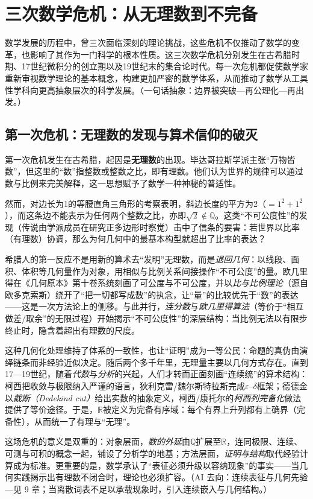 \section{ 三次数学危机：从无理数到不完备}

数学发展的历程中，曾三次面临深刻的理论挑战，这些危机不仅推动了数学的变革，也影响了其作为一门科学的根本性质。这三次数学危机分别发生在古希腊时期、17世纪微积分的创立期以及19世纪末的集合论时代。每一次危机都促使数学家重新审视数学理论的基本概念，构建更加严密的数学体系，从而推动了数学从工具性学科向更高抽象层次的科学发展。{（一句话抽象：边界被突破—再公理化—再出发。）}

\subsection{第一次危机：无理数的发现与算术信仰的破灭}
第一次危机发生在古希腊，起因是{\bf 无理数}的出现。毕达哥拉斯学派主张“万物皆数”，但这里的“数”指整数或整数之比，即有理数。他们认为世界的规律可以通过数与比例来完美解释，这一思想赋予了数学一种神秘的普适性。

然而，对边长为1的等腰直角三角形的考察表明，斜边长度的平方为2（$=1^2+1^2$），而这条边不能表示为任何两个整数之比，亦即$\sqrt{2}\notin \mathbb{Q}$。这类“不可公度性”的发现（传说由学派成员在研究正多边形时察觉）击中了信条的要害：若世界以比率（有理数）协调，那么为何几何中的最基本构型就超出了比率的表达？

希腊人的第一反应不是用新的算术去“发明”无理数，而是{\itshape 退回几何}：以线段、面积、体积等几何量作为对象，用相似与比例关系间接操作“不可公度”的量。欧几里得在《几何原本》第十卷系统刻画了可公度与不可公度，并以{\itshape 比与比例理论}（源自欧多克索斯）绕开了“把一切都写成数”的执念，让“量”的比较优先于“数”的表达——这是一次方法论上的侧移。与此并行，{\itshape 连分数}与{\itshape 欧几里得算法}（等价于“相互做差/取余”的无限过程）开始揭示“不可公度性”的深层结构：当比例无法以有限步终止时，隐含着超出有理数的尺度。

这种几何化处理维持了体系的一致性，也让“证明”成为一等公民：命题的真伪由演绎链条而非经验近似决定。随后两个多千年里，无理量主要以几何方式存在。直到17—19世纪，随着{\itshape 代数}与{\itshape 分析}的兴起，人们才转而正面刻画“连续统”的算术结构：柯西把收敛与极限纳入严谨的语言，狄利克雷/魏尔斯特拉斯完成$\varepsilon$–$\delta$框架；德德金以{\itshape 截断（Dedekind cut）}给出实数的抽象定义，柯西/康托尔的{\itshape 柯西列完备化}做法提供了等价途径。于是，$\mathbb{R}$被定义为完备有序域：每个有界上升列都有上确界（完备性），从而统一了有理与“无理”。

这场危机的意义是双重的：对象层面，{\itshape 数的外延}由$\mathbb{Q}$扩展至$\mathbb{R}$，连同极限、连续、可测与可积的概念一起，铺设了分析学的地基；方法层面，{\itshape 证明与结构}取代经验计算成为标准。更重要的是，数学承认了“表征必须升级以容纳现象”的事实——当几何实践揭示出有理数不闭合时，理论也必须扩容。{（AI 去向：连续表征与几何先验—见 9 章；当离散词表不足以承载现象时，引入连续嵌入与几何结构。）}

